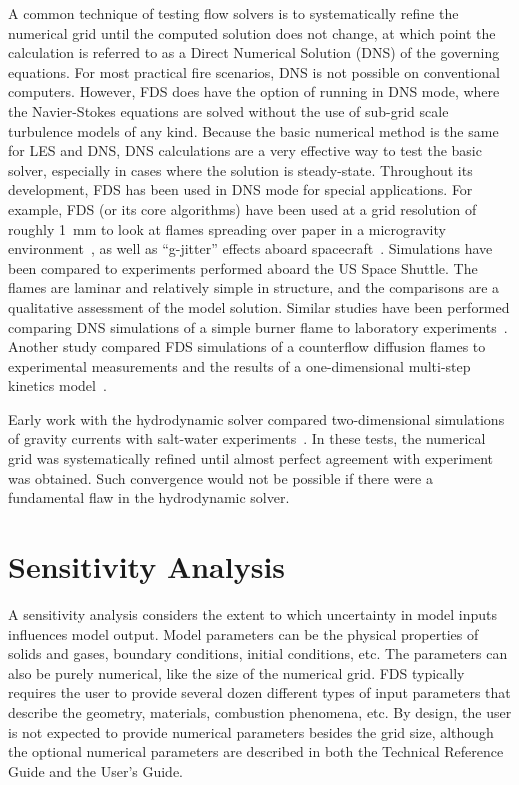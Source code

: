 \documentclass[11pt]{book}
\begin{document}
A common technique of testing flow solvers is to systematically refine the numerical grid until the computed solution does not change, at which point
the calculation is referred to as a Direct Numerical Solution (DNS) of the governing equations.  For most practical fire scenarios, DNS is not
possible on conventional computers. However, FDS does have the option of running in DNS mode, where the Navier-Stokes equations are solved without
the use of sub-grid scale turbulence models of any kind. Because the basic numerical method is the same for LES and DNS, DNS calculations are a very
effective way to test the basic solver, especially in cases where the solution is steady-state. Throughout its development, FDS has been used in DNS
mode for special applications.  For example, FDS (or its core algorithms) have been used at a grid resolution of roughly 1~mm to look at flames
spreading over paper in a microgravity environment~\cite{McGrattan:C&F1996,Kashiwagi:CS1996,Mell:CS98,Mell:CS00,Prasad:CS2002,Nakamura:C&F2002}, as
well as ``g-jitter'' effects aboard spacecraft~\cite{Mell:g-jitter}. Simulations have been compared to experiments performed aboard the US Space
Shuttle.  The flames are laminar and relatively simple in structure, and the comparisons are a qualitative assessment of the model solution. Similar
studies have been performed comparing DNS simulations of a simple burner flame to laboratory experiments~\cite{Mukhopadhyay:1}. Another study
compared FDS simulations of a counterflow diffusion flames to experimental measurements and the results of a one-dimensional multi-step kinetics
model~\cite{Hamins:NASA}.

Early work with the hydrodynamic solver compared two-dimensional simulations of gravity currents with salt-water experiments~\cite{McGrattan:1}. In
these tests, the numerical grid was systematically refined until almost perfect agreement with experiment was obtained. Such convergence would not be
possible if there were a fundamental flaw in the hydrodynamic solver.




\section{Sensitivity Analysis}

A sensitivity  analysis considers the  extent to which  uncertainty in model  inputs influences  model output.  Model parameters  can  be the
physical properties of solids  and gases, boundary conditions, initial conditions, etc. The parameters  can also be  purely numerical, like
the size  of the numerical grid. FDS  typically requires the user to  provide several  dozen different  types of  input  parameters that describe the
geometry, materials,  combustion phenomena, etc. By design,  the user  is  not expected  to  provide numerical  parameters besides the grid
size,  although the optional numerical parameters are described in both the Technical Reference Guide and the User's Guide.
\end{document}
